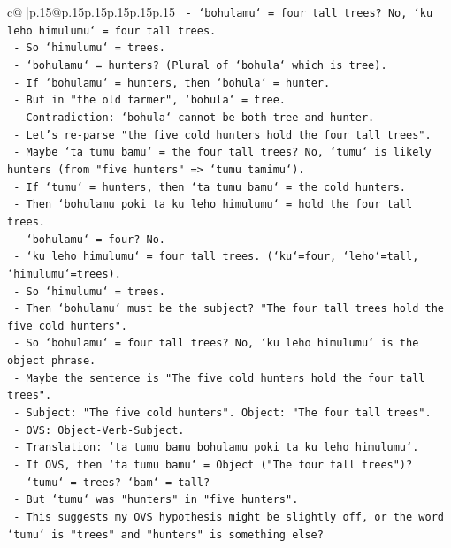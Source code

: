 \documentclass{article}
\begin{document}
{\begin{supertabular}{c@{$\;$}|p{.15\linewidth}@{}p{.15\linewidth}p{.15\linewidth}p{.15\linewidth}p{.15\linewidth}p{.15\linewidth}}
{{{\texttt{    {-} `bohulamu` = four tall trees? No, `ku leho himulumu` = four tall trees.} \\
\texttt{    {-} So `himulumu` = trees.} \\
\texttt{    {-} `bohulamu` = hunters? (Plural of `bohula` which is tree).} \\
\texttt{    {-} If `bohulamu` = hunters, then `bohula` = hunter.} \\
\texttt{    {-} But in "the old farmer", `bohula` = tree.} \\
\texttt{    {-} Contradiction: `bohula` cannot be both tree and hunter.} \\
\texttt{  {-} Let's re{-}parse "the five cold hunters hold the four tall trees".} \\
\texttt{    {-} Maybe `ta tumu bamu` = the four tall trees? No, `tumu` is likely hunters (from "five hunters" => `tumu tamimu`).} \\
\texttt{    {-} If `tumu` = hunters, then `ta tumu bamu` = the cold hunters.} \\
\texttt{    {-} Then `bohulamu poki ta ku leho himulumu` = hold the four tall trees.} \\
\texttt{    {-} `bohulamu` = four? No.} \\
\texttt{    {-} `ku leho himulumu` = four tall trees. (`ku`=four, `leho`=tall, `himulumu`=trees).} \\
\texttt{    {-} So `himulumu` = trees.} \\
\texttt{    {-} Then `bohulamu` must be the subject? "The four tall trees hold the five cold hunters".} \\
\texttt{    {-} So `bohulamu` = four tall trees? No, `ku leho himulumu` is the object phrase.} \\
\texttt{    {-} Maybe the sentence is "The five cold hunters hold the four tall trees".} \\
\texttt{    {-} Subject: "The five cold hunters". Object: "The four tall trees".} \\
\texttt{    {-} OVS: Object{-}Verb{-}Subject.} \\
\texttt{    {-} Translation: `ta tumu bamu bohulamu poki ta ku leho himulumu`.} \\
\texttt{    {-} If OVS, then `ta tumu bamu` = Object ("The four tall trees")?} \\
\texttt{      {-} `tumu` = trees? `bam` = tall?} \\
\texttt{      {-} But `tumu` was "hunters" in "five hunters".} \\
\texttt{    {-} This suggests my OVS hypothesis might be slightly off, or the word `tumu` is "trees" and "hunters" is something else?} \\
}}}
\end{supertabular}}
\end{document}

